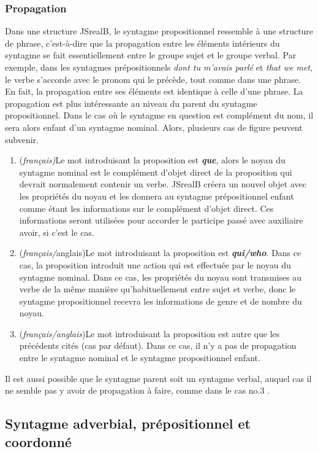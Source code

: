 \documentclass[11pt]{article} %
\newcommand{\system}[1]{\textsf{#1}}
\newcommand{\JSB}{\system{JSrealB}}
\begin{document}
\subsubsection{Propagation}

Dans une structure \JSB{}, le syntagme propositionnel ressemble à
une structure de phrase, c'est-à-dire que la propagation entre les
éléments intérieurs du syntagme se fait essentiellement entre le groupe
sujet et le groupe verbal. Par exemple, dans les syntagmes prépositionnels
\emph{dont tu m'avais parlé }et \emph{that we met}, le verbe s'accorde
avec le pronom qui le précède, tout comme dans une phrase. En fait,
la propagation entre ses éléments est identique à celle d'une phrase.
La propagation est plus intéressante au niveau du parent du syntagme
propositionnel. Dans le cas où le syntagme en question est complément
du nom, il sera alors enfant d'un syntagme nominal. Alors, plusieurs
cas de figure peuvent subvenir. 
\begin{enumerate}
\item (\emph{français)}Le mot introduisant la proposition est \textbf{\emph{que}},
alors le noyau du syntagme nominal est le complément d'objet direct
de la proposition qui devrait normalement contenir un verbe. \JSB{}
créera un nouvel objet avec les propriétés du noyau et les donnera
au syntagme prépositionnel enfant comme étant les informations sur
le complément d'objet direct. Ces informations seront utilisées pour
accorder le participe passé avec auxiliaire avoir, si c'est le cas.
\item (\emph{français/}anglais)Le mot introduisant la proposition est \textbf{\emph{qui/who}}.
Dans ce cas, la proposition introduit une action qui est effectuée
par le noyau du syntagme nominal. Dans ce cas, les propriétés du noyau
sont transmises au verbe de la même manière qu'habituellement entre
sujet et verbe, donc le syntagme propositionnel recevra les informations
de genre et de nombre du noyau.
\item (\emph{français/anglais})Le mot introduisant la proposition est autre
que les précédents cités (cas par défaut). Dans ce cas, il n'y a pas
de propagation entre le syntagme nominal et le syntagme propositionnel
enfant. 
\end{enumerate}
Il est aussi possible que le syntagme parent soit un syntagme verbal,
auquel cas il ne semble pas y avoir de propagation à faire, comme
dans le cas no.3 .

\subsection{Syntagme adverbial, prépositionnel et coordonné}
\end{document}
